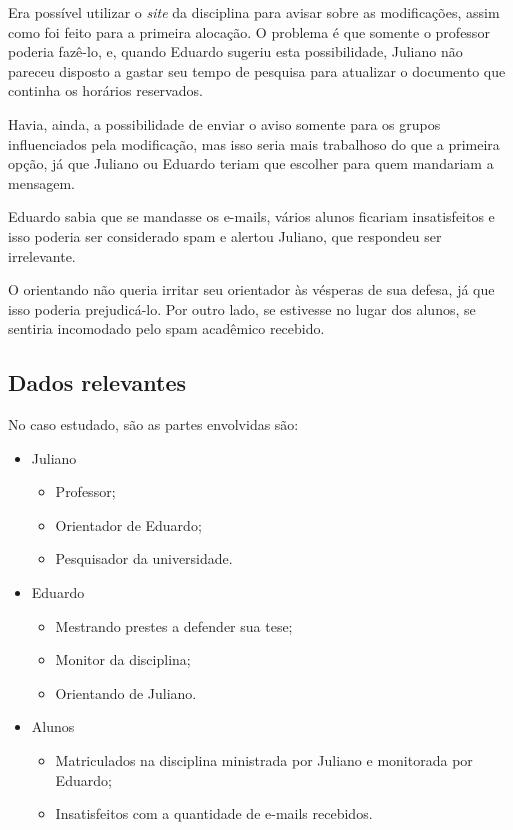 \documentclass[a4paper,dvipdfm]{article}
\begin{document}
	Era possível utilizar o \emph{site} da disciplina para avisar sobre as modificações, assim como foi feito para a primeira alocação. 
	O problema é que somente o professor poderia fazê-lo, e, quando Eduardo sugeriu esta possibilidade, Juliano não pareceu disposto a gastar seu tempo de pesquisa para atualizar o documento que continha os horários reservados.

	Havia, ainda, a possibilidade de enviar o aviso somente para os grupos influenciados pela modificação, mas isso seria mais trabalhoso do que a primeira opção, já que Juliano ou Eduardo teriam que escolher para quem mandariam a mensagem.
	
	Eduardo sabia que se mandasse os e-mails, vários alunos ficariam insatisfeitos e isso poderia ser considerado spam e alertou Juliano, que respondeu ser irrelevante.

	O orientando não queria irritar seu orientador às vésperas de sua defesa, já que isso poderia prejudicá-lo. 
	Por outro lado, se estivesse no lugar dos alunos, se sentiria incomodado pelo spam acadêmico recebido.

\newpage
	\subsection{Dados relevantes}
		No caso estudado, são as partes envolvidas são:
		\begin{itemize}
			\item Juliano
				\begin{itemize}
					\item Professor;
					\item Orientador de Eduardo;
					\item Pesquisador da universidade.
				\end{itemize}
			\item Eduardo
				\begin{itemize}
					\item Mestrando prestes a defender sua tese;
					\item Monitor da disciplina;
					\item Orientando de Juliano.
				\end{itemize} 
			\item Alunos
				\begin{itemize}
					\item Matriculados na disciplina ministrada por Juliano e monitorada por Eduardo;
					\item Insatisfeitos com a quantidade de e-mails recebidos. 
				\end{itemize}
		\end{itemize}
\end{document}
